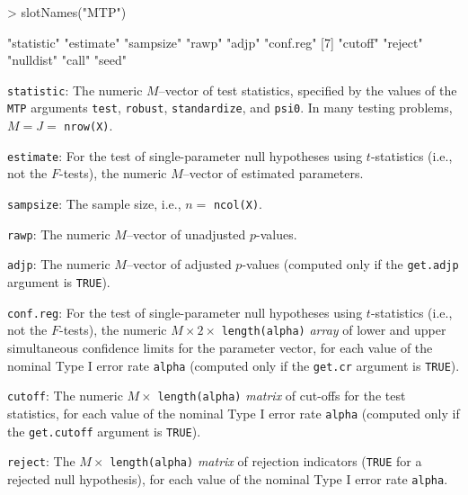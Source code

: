 \documentclass[11pt]{article}
\newcommand{\Robject}[1]{\texttt{#1}}
\newcommand{\Rclass}[1]{\textit{#1}}
\begin{document}
\begin{Schunk}
\begin{Sinput}
> slotNames("MTP")
\end{Sinput}
\begin{Soutput}
 [1] "statistic" "estimate"  "sampsize"  "rawp"      "adjp"      "conf.reg" 
 [7] "cutoff"    "reject"    "nulldist"  "call"      "seed"     
\end{Soutput}
\end{Schunk}


\begin{description}

\item{\Robject{statistic}:} The numeric $M$--vector of test statistics, specified by the values of the \Robject{MTP} arguments \Robject{test}, \Robject{robust}, \Robject{standardize}, and \Robject{psi0}. In many testing problems, $M = J = $ \Robject{nrow(X)}.

\item{\Robject{estimate}:} For the test of single-parameter null hypotheses using $t$-statistics (i.e., not the $F$-tests), the numeric $M$--vector of estimated parameters.

\item{\Robject{sampsize}:} The sample size, i.e., $n=$ \Robject{ncol(X)}.

\item{\Robject{rawp}:} The numeric $M$--vector of unadjusted $p$-values.

\item{\Robject{adjp}:} The numeric $M$--vector of adjusted $p$-values (computed only if the \Robject{get.adjp} argument is \Robject{TRUE}).

\item{\Robject{conf.reg}:}  For the test of single-parameter null hypotheses using $t$-statistics (i.e., not the $F$-tests), the numeric $M \times 2 \times$ \Robject{length(alpha)} \Rclass{array} of lower and upper simultaneous confidence limits for the parameter vector, for each value of the nominal Type I error rate \Robject{alpha} (computed only if the \Robject{get.cr} argument is \Robject{TRUE}). 

\item{\Robject{cutoff}:} The numeric $M \times$ \Robject{length(alpha)} \Rclass{matrix} of cut-offs for the test statistics, for each value of the nominal Type I error rate \Robject{alpha} (computed only if the \Robject{get.cutoff} argument is \Robject{TRUE}).

\item{\Robject{reject}:} 
The $M \times$ \Robject{length(alpha)} \Rclass{matrix} of rejection indicators (\Robject{TRUE} for a rejected null hypothesis), for each value of the nominal Type I error rate \Robject{alpha}.


\end{description}
\end{document}
